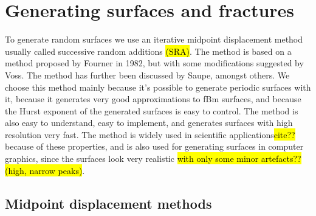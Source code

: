 \chapter{Generating surfaces and fractures\label{chap:generating_surfaces}}


To generate random surfaces we use an iterative midpoint displacement method usually called successive random additions \hl{(SRA)}. The method is based on a method proposed by Fourner in 1982\cite{fournier1982computer}, but with some modifications suggested by Voss\cite{voss1985random, voss1988fractals}. The method has further been discussed by Saupe\cite{saupe1988algorithms}, amongst others. We choose this method mainly because it's possible to generate periodic surfaces with it, because it generates very good approximations to fBm surfaces\cite{zhou2005comparison}, and because the Hurst exponent of the generated surfaces is easy to control. The method is also easy to understand, easy to implement, and generates surfaces with high resolution very fast. The method is widely used in scientific applications\hl{cite??} because of these properties, and is also used for generating surfaces in computer graphics, since the surfaces look very realistic \hl{with only some minor artefacts?? (high, narrow peaks)}.

\section{Midpoint displacement methods}

